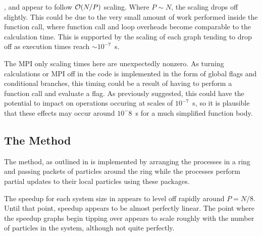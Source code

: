 %
,
 and
appear to follow $\mathcal{O}{\left({ N/P }\right)}$ scaling.
%
Where $P \sim{} N$, the scaling drops off slightly.
%
This could be due to the very small amount of work performed
inside the function call, where function call and loop overheads
become comparable to the calculation time.
%
This is supported by the scaling of each graph tending to drop off
as execution times reach $\sim{} 10^{-7}$~s.

The MPI only scaling times here are unexpectedly nonzero.
%
As turning calculations or MPI off in the code is implemented in
the form of global flags and conditional branches, this timing
could be a result of having to perform a function call and
evaluate a flag.
%
As previously suggested, this could have the potential to impact on
operations occuring at scales of $10^{-7}$~s, so it is plausible
that these effects may occur around $10^-{8}$~s for a much simplified
function body.


%
%

\subsection{The \pairoperation{} Method}

The \pairoperation{} method, as outlined in 
is implemented by arranging the processes in a ring and passing
packets of particles around the ring while the processes perform
partial updates to their local particles using these packages.


%

%
%
\begin{figure}[!h]
    
    \caption{
        \vZeroSpeedupCaption
            {\systolicloop{}}
            {\pairoperation{}}
    }
    \label{fig:v0_systolic_pair_operation_speedups}
\end{figure}


\vZeroSpeedupExplanation
    {}
    {\systolicloop{}}
    {\pairoperation{}}

The speedup for each system size in 
appears to level off rapidly around $P = N/8$.
%
Until that point, speedup appears to be almost perfectly linear.
%
The point where the speedup graphs begin tipping over appears to
scale roughly with the number of particles in the system,
although not quite perfectly.



